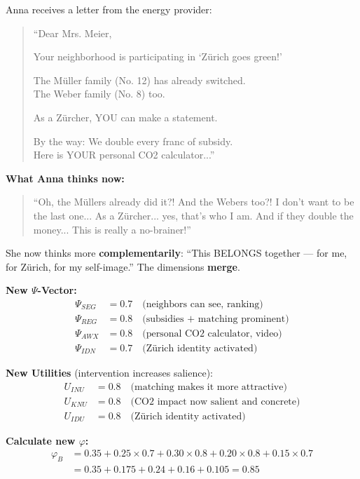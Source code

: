 Anna receives a letter from the energy provider:
\begin{quote}
``Dear Mrs. Meier,

Your neighborhood is participating in `Zürich goes green!'

The Müller family (No. 12) has already switched.\\
The Weber family (No. 8) too.

As a Zürcher, YOU can make a statement.

By the way: We double every franc of subsidy.\\
Here is YOUR personal CO2 calculator...''
\end{quote}

\textbf{What Anna thinks now:}
\begin{quote}
``Oh, the Müllers already did it?! And the Webers too?! I don't want to be the last one... As a Zürcher... yes, that's who I am. And if they double the money... This is really a no-brainer!''
\end{quote}

She now thinks more \textbf{complementarily}: ``This BELONGS together --- for me, for Zürich, for my self-image.'' The dimensions \textbf{merge}.

\textbf{New $\Psi$-Vector:}
\begin{align*}
\Psi_{SEG} &= 0.7 \quad \text{(neighbors can see, ranking)} \\
\Psi_{REG} &= 0.8 \quad \text{(subsidies + matching prominent)} \\
\Psi_{AWX} &= 0.8 \quad \text{(personal CO2 calculator, video)} \\
\Psi_{IDN} &= 0.7 \quad \text{(Zürich identity activated)}
\end{align*}

\textbf{New Utilities} (intervention increases salience):
\begin{align*}
U_{INU} &= 0.8 \quad \text{(matching makes it more attractive)} \\
U_{KNU} &= 0.8 \quad \text{(CO2 impact now salient and concrete)} \\
U_{IDU} &= 0.8 \quad \text{(Zürich identity activated)}
\end{align*}

\textbf{Calculate new $\varphi$:}
\begin{align}
\varphi_B &= 0.35 + 0.25 \times 0.7 + 0.30 \times 0.8 + 0.20 \times 0.8 + 0.15 \times 0.7 \nonumber \\
&= 0.35 + 0.175 + 0.24 + 0.16 + 0.105 = \mathbf{0.85}
\end{align}

